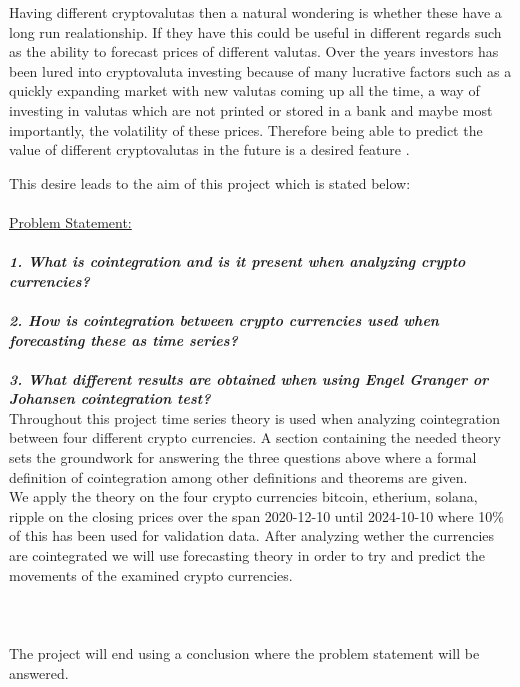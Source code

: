 Having different cryptovalutas then a natural wondering is whether these have a long run realationship. If they have this could be useful in different regards such as the ability to forecast prices of different valutas. Over the years investors has been lured into cryptovaluta investing because of many lucrative factors such as a quickly expanding market with new valutas coming up all the time, a way of investing in valutas which are not printed or stored in a bank and maybe most importantly, the volatility of these prices. Therefore being able to predict the value of different cryptovalutas in the future is a desired feature \cite{investopedia.}.

\newpage

This desire leads to the aim of this project which is stated below:\\\\
\noindent\makebox[\linewidth]{\rule{\textwidth}{0.4pt}}
\underline{Problem Statement:}\\\\
\textbf{\textit{1. What is cointegration and is it present when analyzing crypto currencies?}}\\\\
\textbf{\textit{2. How is cointegration between crypto currencies used when forecasting these as time series?}}\\\\
\textbf{\textit{3. What different results are obtained when using Engel Granger or Johansen cointegration test?}}\\
\noindent\makebox[\linewidth]{\rule{\textwidth}{0.4pt}}
Throughout this project time series theory is used when analyzing cointegration between four different crypto currencies. A section containing the needed theory sets the groundwork for answering the three questions above where a formal definition of cointegration among other definitions and theorems are given.\\
We apply the theory on the four crypto currencies bitcoin, etherium, solana, ripple on the closing prices over the span 2020-12-10 until 2024-10-10 where 10\% of this has been used for validation data. After analyzing wether the currencies are cointegrated we will use forecasting theory in order to try and predict the movements of the examined crypto currencies.\\\\\\\\
The project will end using a conclusion where the problem statement will be answered.



